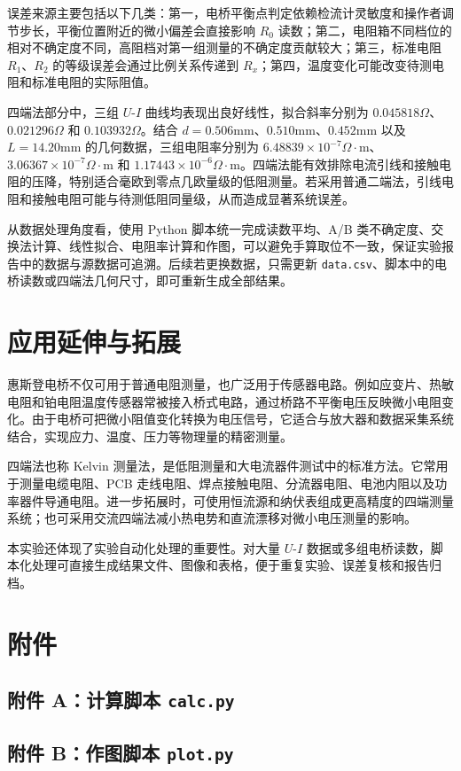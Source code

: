 \documentclass[UTF8,a4paper,12pt]{ctexart}
\begin{document}
误差来源主要包括以下几类：第一，电桥平衡点判定依赖检流计灵敏度和操作者调节步长，平衡位置附近的微小偏差会直接影响 $R_0$ 读数；第二，电阻箱不同档位的相对不确定度不同，高阻档对第一组测量的不确定度贡献较大；第三，标准电阻 $R_1$、$R_2$ 的等级误差会通过比例关系传递到 $R_x$；第四，温度变化可能改变待测电阻和标准电阻的实际阻值。

四端法部分中，三组 $U$-$I$ 曲线均表现出良好线性，拟合斜率分别为 $0.045818\Omega$、$0.021296\Omega$ 和 $0.103932\Omega$。结合 $d=0.506\mathrm{mm}$、$0.510\mathrm{mm}$、$0.452\mathrm{mm}$ 以及 $L=14.20\mathrm{mm}$ 的几何数据，三组电阻率分别为 $6.48839\times10^{-7}\Omega\cdot\mathrm{m}$、$3.06367\times10^{-7}\Omega\cdot\mathrm{m}$ 和 $1.17443\times10^{-6}\Omega\cdot\mathrm{m}$。四端法能有效排除电流引线和接触电阻的压降，特别适合毫欧到零点几欧量级的低阻测量。若采用普通二端法，引线电阻和接触电阻可能与待测低阻同量级，从而造成显著系统误差。

从数据处理角度看，使用 Python 脚本统一完成读数平均、A/B 类不确定度、交换法计算、线性拟合、电阻率计算和作图，可以避免手算取位不一致，保证实验报告中的数据与源数据可追溯。后续若更换数据，只需更新 \texttt{data.csv}、脚本中的电桥读数或四端法几何尺寸，即可重新生成全部结果。

\section{应用延伸与拓展}

惠斯登电桥不仅可用于普通电阻测量，也广泛用于传感器电路。例如应变片、热敏电阻和铂电阻温度传感器常被接入桥式电路，通过桥路不平衡电压反映微小电阻变化。由于电桥可把微小阻值变化转换为电压信号，它适合与放大器和数据采集系统结合，实现应力、温度、压力等物理量的精密测量。

四端法也称 Kelvin 测量法，是低阻测量和大电流器件测试中的标准方法。它常用于测量电缆电阻、PCB 走线电阻、焊点接触电阻、分流器电阻、电池内阻以及功率器件导通电阻。进一步拓展时，可使用恒流源和纳伏表组成更高精度的四端测量系统；也可采用交流四端法减小热电势和直流漂移对微小电压测量的影响。

本实验还体现了实验自动化处理的重要性。对大量 $U$-$I$ 数据或多组电桥读数，脚本化处理可直接生成结果文件、图像和表格，便于重复实验、误差复核和报告归档。

\newpage

\section{附件}

\subsection{附件 A：计算脚本 \texttt{calc.py}}


\newpage

\subsection{附件 B：作图脚本 \texttt{plot.py}}

\end{document}
